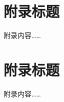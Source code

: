 \cleardoublepage

{

    \appendixsecmajornumbering

    \section{附录标题}

    附录内容……

    \section{附录标题}

    附录内容……

    \removeappendixsecmajornumbering
}

